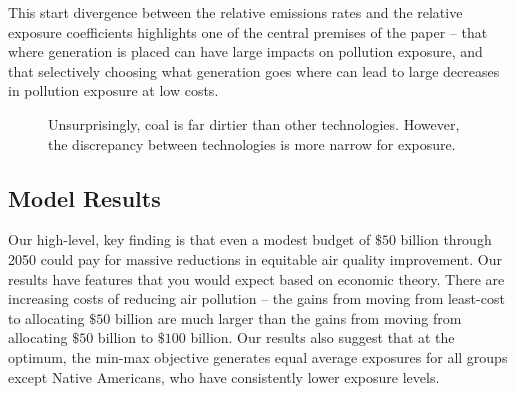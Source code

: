 \documentclass[a4paper]{article}
\theoremstyle{definition}
\theoremstyle{plain}
\begin{document}
This start divergence between the relative emissions rates and the relative exposure coefficients highlights one of the central premises of the paper -- that where generation is placed can have large impacts on pollution exposure, and that selectively choosing what generation goes where can lead to large decreases in pollution exposure at low costs.

\begin{figure}
\centering
{}%
\hfill
{}%
\hfill
\caption{Unsurprisingly, coal is far dirtier than other technologies.  However, the discrepancy between technologies is more narrow for exposure.}
\label{EmissionsExposureCoefs}
\end{figure}

\subsection{Model Results}
Our high-level, key finding is that even a modest budget of $\$50$ billion through 2050 could pay for massive reductions in equitable air quality improvement. Our results have features that you would expect based on economic theory. There are increasing costs of reducing air pollution -- the gains from moving from least-cost to allocating $\$50$ billion are much larger than the gains from moving from allocating $\$50$ billion to $\$100$ billion. Our results also suggest that at the optimum, the min-max objective generates equal average exposures for all groups except Native Americans, who have consistently lower exposure levels.
\end{document}
